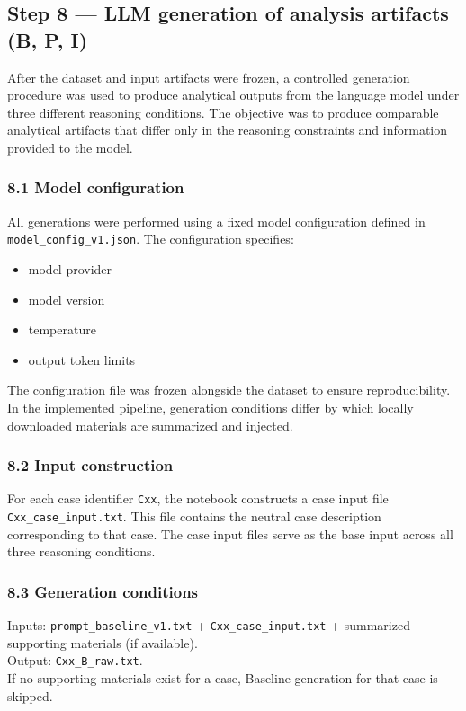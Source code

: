 {\subsection*{Step 8 --- LLM generation of analysis artifacts (B, P, I)}
After the dataset and input artifacts were frozen, a controlled generation procedure was used to produce analytical outputs
from the language model under three different reasoning conditions. The objective was to produce comparable analytical artifacts
that differ only in the reasoning constraints and information provided to the model.

\subsubsection*{8.1 Model configuration}
All generations were performed using a fixed model configuration defined in \texttt{model\_config\_v1.json}. The configuration specifies:
\begin{itemize}
  \item model provider
  \item model version
  \item temperature
  \item output token limits
\end{itemize}
The configuration file was frozen alongside the dataset to ensure reproducibility.
In the implemented pipeline, generation conditions differ by which locally downloaded materials are summarized and injected.


\subsubsection*{8.2 Input construction}
For each case identifier \texttt{Cxx}, the notebook constructs a case input file \texttt{Cxx\_case\_input.txt}.
This file contains the neutral case description corresponding to that case. The case input files serve as the base input
across all three reasoning conditions.

\subsubsection*{8.3 Generation conditions}
Inputs: \texttt{prompt\_baseline\_v1.txt} + \texttt{Cxx\_case\_input.txt} + summarized supporting materials (if available).\\
Output: \texttt{Cxx\_B\_raw.txt}.\\
If no supporting materials exist for a case, Baseline generation for that case is skipped.


}
